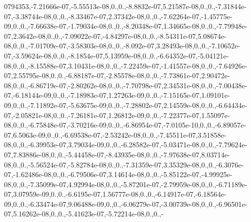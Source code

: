 \begin{DoxyCompactItemize}
0794353,-\/7.\-21666e-\/07,-\/5.\-55513e-\/08,0.,0.,-\/8.\-8832e-\/07,5.\-21587e-\/08,0.,0.,-\/7.\-31844e-\/07,-\/3.\-38744e-\/08,0.,0.,-\/8.\-33467e-\/07,2.\-37342e-\/08,0.,0.,-\/7.\-62264e-\/07,-\/1.\-45775e-\/09,0.,0.,-\/7.\-66638e-\/07,-\/1.\-79034e-\/08,0.,0.,-\/8.\-20348e-\/07,1.\-34665e-\/08,0.,0.,-\/7.\-79948e-\/07,2.\-3642e-\/08,0.,0.,-\/7.\-09022e-\/07,-\/4.\-84297e-\/08,0.,0.,-\/8.\-54311e-\/07,5.\-08674e-\/08,0.,0.,-\/7.\-01709e-\/07,-\/3.\-58303e-\/08,0.,0.,-\/8.\-092e-\/07,3.\-28493e-\/08,0.,0.,-\/7.\-10652e-\/07,-\/3.\-59624e-\/08,0.,0.,-\/8.\-1854e-\/07,5.\-13959e-\/08,0.,0.,-\/6.\-64352e-\/07,-\/5.\-04121e-\/08,0.,0.,-\/8.\-15588e-\/07,3.\-10431e-\/08,0.,0.,-\/7.\-22459e-\/07,-\/1.\-41557e-\/08,0.,0.,-\/7.\-64926e-\/07,2.\-55795e-\/08,0.,0.,-\/6.\-88187e-\/07,-\/2.\-85578e-\/08,0.,0.,-\/7.\-73861e-\/07,2.\-90472e-\/08,0.,0.,-\/6.\-86719e-\/07,-\/2.\-80262e-\/08,0.,0.,-\/7.\-70798e-\/07,2.\-34531e-\/08,0.,0.,-\/7.\-00438e-\/07,-\/6.\-18144e-\/09,0.,0.,-\/7.\-18983e-\/07,1.\-27263e-\/09,0.,0.,-\/7.\-15165e-\/07,1.\-09101e-\/09,0.,0.,-\/7.\-11892e-\/07,-\/5.\-63675e-\/09,0.,0.,-\/7.\-28802e-\/07,2.\-14559e-\/08,0.,0.,-\/6.\-64434e-\/07,-\/2.\-05821e-\/08,0.,0.,-\/7.\-26181e-\/07,1.\-26812e-\/09,0.,0.,-\/7.\-22377e-\/07,1.\-55097e-\/08,0.,0.,-\/6.\-75848e-\/07,-\/3.\-70216e-\/09,0.,0.,-\/6.\-86954e-\/07,-\/7.\-0105e-\/10,0.,0.,-\/6.\-89057e-\/07,6.\-5063e-\/09,0.,0.,-\/6.\-69538e-\/07,-\/2.\-53242e-\/08,0.,0.,-\/7.\-45511e-\/07,3.\-51858e-\/08,0.,0.,-\/6.\-39953e-\/07,3.\-79034e-\/09,0.,0.,-\/6.\-28582e-\/07,-\/5.\-03471e-\/08,0.,0.,-\/7.\-79624e-\/07,7.\-83886e-\/08,0.,0.,-\/5.\-44458e-\/07,-\/8.\-43935e-\/08,0.,0.,-\/7.\-97638e-\/07,8.\-03714e-\/08,0.,0.,-\/5.\-56524e-\/07,-\/5.\-82784e-\/08,0.,0.,-\/7.\-31359e-\/07,3.\-35329e-\/08,0.,0.,-\/6.\-3076e-\/07,-\/1.\-62486e-\/08,0.,0.,-\/6.\-79506e-\/07,3.\-14614e-\/08,0.,0.,-\/5.\-85122e-\/07,-\/4.\-99925e-\/08,0.,0.,-\/7.\-35099e-\/07,4.\-92994e-\/08,0.,0.,-\/5.\-87201e-\/07,-\/2.\-79959e-\/08,0.,0.,-\/6.\-71189e-\/07,3.\-07959e-\/09,0.,0.,-\/6.\-6195e-\/07,1.\-56777e-\/08,0.,0.,-\/6.\-14917e-\/07,-\/6.\-18564e-\/09,0.,0.,-\/6.\-33474e-\/07,9.\-06488e-\/09,0.,0.,-\/6.\-06279e-\/07,-\/3.\-00739e-\/08,0.,0.,-\/6.\-96501e-\/07,5.\-16262e-\/08,0.,0.,-\/5.\-41623e-\/07,-\/5.\-72214e-\/08,0.,0.,-\
\end{DoxyCompactItemize}
